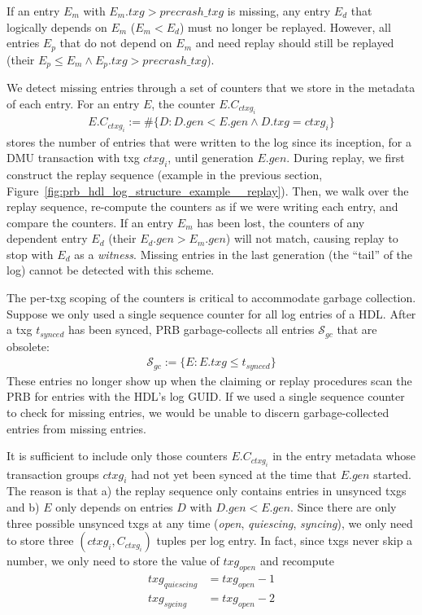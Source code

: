 \documentclass[12pt,a4paper,twoside]{book}
\begin{document}
{If an entry $E_m$ with $E_m.txg > precrash\_txg$ is missing, any entry $E_d$ that logically depends on $E_m$ ($E_m < E_d$) must no longer be replayed.
However, all entries $E_p$ that do not depend on $E_m$ and need replay should still be replayed (their $E_p \le E_m \wedge E_p.txg > precrash\_txg$).

We detect missing entries through a set of counters that we store in the metadata of each entry.
For an entry $E$, the counter $E.C_{ctxg_i}$
\begin{gather*}
    E.C_{ctxg_i} := \#\{ D : D.gen < E.gen \wedge D.txg = ctxg_i\}
\end{gather*}
stores the number of entries that were written to the log since its inception, for a DMU transaction with txg $ctxg_i$, until generation $E.gen$.
During replay, we first construct the replay sequence (example in the previous section, Figure~\ref{fig:prb_hdl_log_structure_example__replay}).
Then, we walk over the replay sequence, re-compute the counters as if we were writing each entry, and compare the counters.
If an entry $E_m$ has been lost, the counters of any dependent entry $E_d$ (their $E_d.gen > E_m.gen$) will not match, causing replay to stop with $E_d$ as a \textit{witness}.
Missing entries in the last generation (the ``tail'' of the log) cannot be detected with this scheme.

The per-txg scoping of the counters is critical to accommodate garbage collection.
Suppose we only used a single sequence counter for all log entries of a HDL.
After a txg $t_{synced}$ has been synced, PRB garbage-collects all entries $\mathcal{S}_{gc}$ that are obsolete:
\begin{align*}
    \mathcal{S}_{gc} := \{ E : E.txg \le t_{synced}\}
\end{align*}
These entries no longer show up when the claiming or replay procedures scan the PRB for entries with the HDL's log GUID.
If we used a single sequence counter to check for missing entries, we would be unable to discern garbage-collected entries from missing entries.

It is sufficient to include only those counters $E.C_{ctxg_i}$ in the entry metadata whose transaction groups $ctxg_i$ had not yet been synced at the time that $E.gen$ started.
The reason is that a) the replay sequence only contains entries in unsynced txgs and b) $E$ only depends on entries $D$ with $D.gen < E.gen$.
Since there are only three possible unsynced txgs at any time (\textit{open}, \textit{quiescing}, \textit{syncing}), we only need to store three $(ctxg_i, C_{ctxg_i})$ tuples per log entry.
In fact, since txgs never skip a number, we only need to store the value of $txg_{open}$ and recompute
\begin{align*}
    txg_{quiescing} & = txg_{open} - 1 \\
    txg_{sycing} & = txg_{open} - 2
\end{align*}

}
\end{document}
